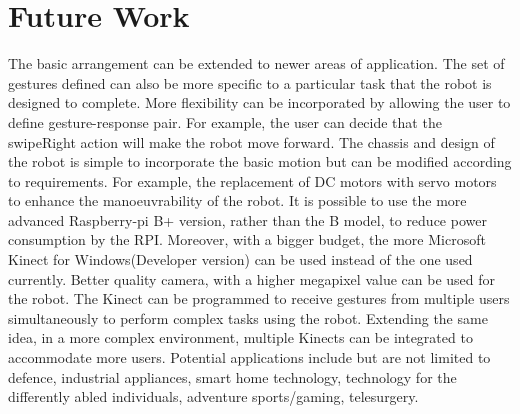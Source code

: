 \section{Future Work}
The basic arrangement can be extended to newer areas of application. The set of gestures defined can also be more specific to a particular task that the robot is designed to complete. More flexibility can be incorporated by allowing the user to define gesture-response pair. For example, the user can decide that the swipeRight action will make the robot move forward. The chassis and design of the robot is simple to incorporate the basic motion but can be modified according to requirements. For example, the replacement of DC motors with servo motors to enhance the manoeuvrability of the robot.  It is possible to use the more advanced Raspberry-pi B+ version, rather than the B model, to reduce power consumption by the RPI. Moreover, with a bigger budget, the more Microsoft Kinect for Windows(Developer version) can be used instead of the one used currently. Better quality camera, with a higher megapixel value can be used for the robot. The Kinect can be programmed to receive gestures from multiple users simultaneously to perform complex tasks using the robot. Extending the same idea, in a more complex environment, multiple Kinects can be integrated to accommodate more users. Potential applications include but are not limited to defence, industrial appliances, smart home technology, technology for the differently abled individuals, adventure sports/gaming, telesurgery. 

